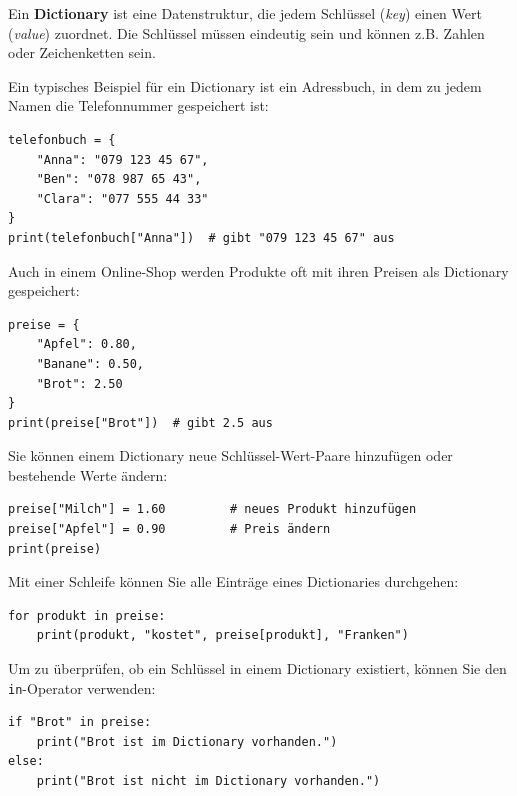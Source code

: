 \begin{mydefinition}[Dictionary]
Ein \textbf{Dictionary} ist eine Datenstruktur, die jedem Schlüssel (\textit{key}) einen Wert (\textit{value}) zuordnet. Die Schlüssel müssen eindeutig sein und können z.B. Zahlen oder Zeichenketten sein.
\end{mydefinition}

\begin{myexample}
Ein typisches Beispiel für ein Dictionary ist ein Adressbuch, in dem zu jedem Namen die Telefonnummer gespeichert ist:

\begin{lstlisting}
telefonbuch = {
    "Anna": "079 123 45 67",
    "Ben": "078 987 65 43",
    "Clara": "077 555 44 33"
}
print(telefonbuch["Anna"])  # gibt "079 123 45 67" aus
\end{lstlisting}
\end{myexample}

\begin{myexample}
Auch in einem Online-Shop werden Produkte oft mit ihren Preisen als Dictionary gespeichert:
\begin{lstlisting}
preise = {
    "Apfel": 0.80,
    "Banane": 0.50,
    "Brot": 2.50
}
print(preise["Brot"])  # gibt 2.5 aus
\end{lstlisting}
\end{myexample}

\begin{myexample}
Sie können einem Dictionary neue Schlüssel-Wert-Paare hinzufügen oder bestehende Werte ändern:
\begin{lstlisting}
preise["Milch"] = 1.60         # neues Produkt hinzufügen
preise["Apfel"] = 0.90         # Preis ändern
print(preise)
\end{lstlisting}
\end{myexample}

\begin{myexample}
Mit einer Schleife können Sie alle Einträge eines Dictionaries durchgehen:
\begin{lstlisting}
for produkt in preise:
    print(produkt, "kostet", preise[produkt], "Franken")
\end{lstlisting}
\end{myexample}

\begin{myexample}\label{ex:keyExists}
Um zu überprüfen, ob ein Schlüssel in einem Dictionary existiert, können Sie den \lstinline|in|-Operator verwenden:
\begin{lstlisting}
if "Brot" in preise:
    print("Brot ist im Dictionary vorhanden.")
else:
    print("Brot ist nicht im Dictionary vorhanden.")
\end{lstlisting}
\end{myexample}

